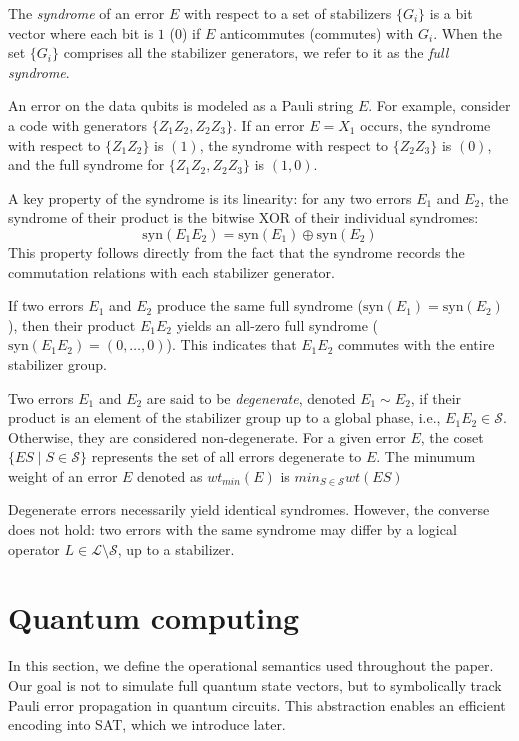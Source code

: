 \documentclass[acmsmallw,review]{acmart}
\begin{document}
The \textit{syndrome} of an error $E$ with respect to a set of stabilizers $\{G_i\}$ is a bit vector where each bit is $1$ ($0$) if $E$ anticommutes (commutes) with $G_i$. When the set $\{G_i\}$ comprises all the stabilizer generators, we refer to it as the \textit{full syndrome}.

An error on the data qubits is modeled as a Pauli string $E$. For example, consider a code with generators $\{Z_1 Z_2, Z_2 Z_3\}$. If an error $E = X_1$ occurs, the syndrome with respect to $\{Z_1 Z_2\}$ is $(1)$, the syndrome with respect to $\{Z_2 Z_3\}$ is $(0)$, and the full syndrome for $\{Z_1 Z_2, Z_2 Z_3\}$ is $(1,0)$.

A key property of the syndrome is its linearity: for any two errors $E_1$ and $E_2$, the syndrome of their product is the bitwise XOR of their individual syndromes:
$$ \text{syn}(E_1 E_2) = \text{syn}(E_1) \oplus \text{syn}(E_2) $$
This property follows directly from the fact that the syndrome records the commutation relations with each stabilizer generator.

If two errors $E_1$ and $E_2$ produce the same full syndrome ($\text{syn}(E_1) = \text{syn}(E_2)$), then their product $E_1 E_2$ yields an all-zero full syndrome ($\text{syn}(E_1 E_2) = (0, \dots, 0)$). This indicates that $E_1 E_2$ commutes with the entire stabilizer group.

Two errors $E_1$ and $E_2$ are said to be \emph{degenerate}, denoted $E_1 \sim E_2$, if their product is an element of the stabilizer group up to a global phase, i.e., $E_1 E_2 \in \mathcal{S}$. Otherwise, they are considered non-degenerate. For a given error $E$, the coset $\{ES \mid S \in \mathcal{S}\}$ represents the set of all errors degenerate to $E$. The minumum weight of an error $E$ denoted as $wt_{min}(E)$ is $min_{S \in \mathcal{S}} wt(ES)$

Degenerate errors necessarily yield identical syndromes. However, the converse does not hold: two errors with the same syndrome may differ by a logical operator $L \in \mathcal{L} \setminus \mathcal{S}$, up to a stabilizer.




\section{Quantum computing}
\label{sec:quantum computing}
In this section, we define the operational semantics used throughout the paper. 
Our goal is not to simulate full quantum state vectors, but to symbolically track Pauli error propagation in quantum circuits. 
This abstraction enables an efficient encoding into SAT, which we introduce later.
\end{document}
